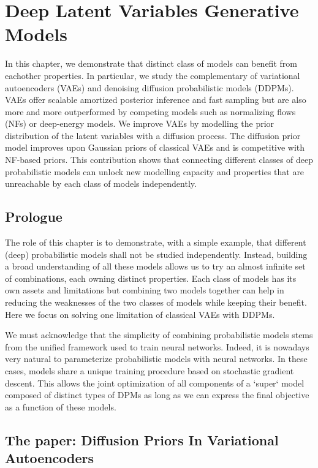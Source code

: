 \chapter{Deep Latent Variables Generative Models}\label{ch:03}

\begin{chapter_outline}
  In this chapter, we demonstrate that distinct class of models can benefit from eachother properties. In particular, we study the complementary of variational autoencoders (VAEs) and denoising diffusion probabilistic models (DDPMs). VAEs offer scalable amortized posterior inference and fast sampling but are also more and more outperformed by competing models such as normalizing flows (NFs) or deep-energy models. We improve VAEs by modelling the prior distribution of the latent variables with a diffusion process. The diffusion prior model improves upon Gaussian priors of classical VAEs and is competitive with NF-based priors.
  This contribution shows that connecting different classes of deep probabilistic models can unlock new modelling capacity and properties that are unreachable by each class of models independently.
\end{chapter_outline}
\section{Prologue}
The role of this chapter is to demonstrate, with a simple example, that different (deep) probabilistic models shall not be studied independently. Instead, building a broad understanding of all these models allows us to try an almost infinite set of combinations, each owning distinct properties. Each class of models has its own assets and limitations but combining two models together can help in reducing the weaknesses of the two classes of models while keeping their benefit. Here we focus on solving one limitation of classical VAEs with DDPMs.

We must acknowledge that the simplicity of combining probabilistic models stems from the unified framework used to train neural networks. Indeed, it is nowadays very natural to parameterize probabilistic models with neural networks. In these cases, models share a unique training procedure based on stochastic gradient descent. This allows the joint optimization of all components of a `super` model composed of distinct types of DPMs as long as we can express the final objective as a function of these models.

\section{The paper: Diffusion Priors In Variational Autoencoders}

